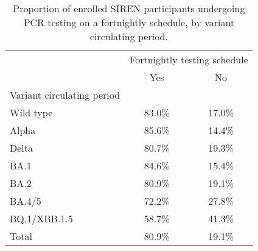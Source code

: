 \begin{table}[!h]
\centering\centering
\caption{\label{tab:fortnightly_schedule}Proportion of enrolled SIREN participants undergoing PCR testing on a fortnightly schedule, by variant circulating period.}
\centering
\begin{tabular}[t]{lcc}
\toprule
\multicolumn{1}{c}{ } & \multicolumn{2}{c}{Fortnightly testing schedule} \\
\cmidrule(l{3pt}r{3pt}){2-3}
 & Yes & No\\
\midrule
Variant circulating period &  & \\
\hspace{1em}Wild type & 83.0\% & 17.0\%\\
\hspace{1em}Alpha & 85.6\% & 14.4\%\\
\hspace{1em}Delta & 80.7\% & 19.3\%\\
\hspace{1em}BA.1 & 84.6\% & 15.4\%\\
\hspace{1em}BA.2 & 80.9\% & 19.1\%\\
\hspace{1em}BA.4/5 & 72.2\% & 27.8\%\\
\hspace{1em}BQ.1/XBB.1.5 & 58.7\% & 41.3\%\\
Total & 80.9\% & 19.1\%\\
\bottomrule
\end{tabular}
\end{table}
